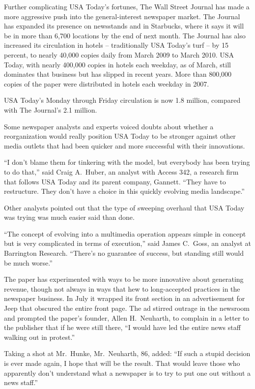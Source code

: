 ﻿\documentclass[12pt]{article}
\begin{document}
Further complicating USA Today's fortunes, The Wall Street Journal has made a more aggressive push
into the general-interest newspaper market. The Journal has expanded its presence on newsstands and
in Starbucks, where it says it will be in more than 6,700 locations by the end of next month. The
Journal has also increased its circulation in hotels -- traditionally USA Today's turf -- by 15
percent, to nearly 40,000 copies daily from March 2009 to March 2010. USA Today, with nearly 400,000
copies in hotels each weekday, as of March, still dominates that business but has slipped in recent
years. More than 800,000 copies of the paper were distributed in hotels each weekday in 2007.

USA Today's Monday through Friday circulation is now 1.8 million, compared with The Journal's 2.1
million.

Some newspaper analysts and experts voiced doubts about whether a reorganization would really
position USA Today to be stronger against other media outlets that had been quicker and more
successful with their innovations.

``I don't blame them for tinkering with the model, but everybody has been trying to do that,'' said
Craig A.~Huber, an analyst with Access 342, a research firm that follows USA Today and its parent
company, Gannett. ``They have to restructure. They don't have a choice in this quickly evolving
media landscape.''

Other analysts pointed out that the type of sweeping overhaul that USA Today was trying was much
easier said than done.

``The concept of evolving into a multimedia operation appears simple in concept but is very
complicated in terms of execution,'' said James C.~Goss, an analyst at Barrington Research.
``There's no guarantee of success, but standing still would be much worse.''

The paper has experimented with ways to be more innovative about generating revenue, though not
always in ways that hew to long-accepted practices in the newspaper business. In July it wrapped its
front section in an advertisement for Jeep that obscured the entire front page. The ad stirred
outrage in the newsroom and prompted the paper's founder, Allen H.~Neuharth, to complain in a letter
to the publisher that if he were still there, ``I would have led the entire news staff walking out
in protest.''

Taking a shot at Mr.~Hunke, Mr.~Neuharth, 86, added: ``If such a stupid decision is ever made again,
I hope that will be the result. That would leave those who apparently don't understand what a
newspaper is to try to put one out without a news staff.''
\end{document}
